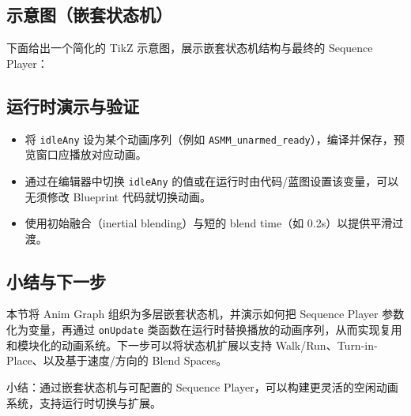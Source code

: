 \documentclass[10pt,CJKmath]{zhbook-v1}
\newcommand{\il}[1]{\texttt{#1}}%
\begin{document}
\subsection{示意图（嵌套状态机）}
下面给出一个简化的 TikZ 示意图，展示嵌套状态机结构与最终的 Sequence Player：

\begin{center}
\end{center}

\subsection{运行时演示与验证}
\begin{itemize}
  \item 将 \il{idleAny} 设为某个动画序列（例如 \il{ASMM_unarmed_ready}），编译并保存，预览窗口应播放对应动画。
  \item 通过在编辑器中切换 \il{idleAny} 的值或在运行时由代码/蓝图设置该变量，可以无须修改 Blueprint 代码就切换动画。
  \item 使用初始融合（inertial blending）与短的 blend time（如 0.2s）以提供平滑过渡。
\end{itemize}

\subsection{小结与下一步}
本节将 Anim Graph 组织为多层嵌套状态机，并演示如何把 Sequence Player 参数化为变量，再通过 \il{onUpdate} 类函数在运行时替换播放的动画序列，从而实现复用和模块化的动画系统。下一步可以将状态机扩展以支持 Walk/Run、Turn-in-Place、以及基于速度/方向的 Blend Spaces。\par

\bigskip
\noindent 小结：通过嵌套状态机与可配置的 Sequence Player，可以构建更灵活的空闲动画系统，支持运行时切换与扩展。
\end{document}
